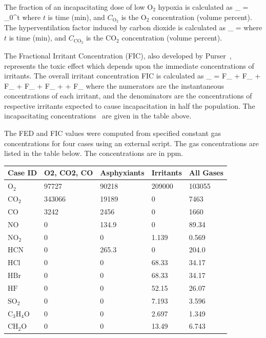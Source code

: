 \documentclass[11pt]{book}
\begin{document}
The fraction of an incapacitating dose of low O${}_2$ hypoxia is calculated as
\be
{}_ =  \int_0^t 
\ee
where $t$ is time (min), and $C_\mathrm{O_2}$ is the O${}_2$ concentration (volume percent).
The hyperventilation factor induced by carbon dioxide is calculated as
\be
{}_ =  \label{co2hyp2}
\ee
where $t$ is time (min), and $C_\mathrm{CO_2}$ is the CO${}_2$ concentration (volume percent).

The Fractional Irritant Concentration (FIC), also developed by Purser~\cite{SFPE:Purser}, represents the toxic effect which
depends upon the immediate concentrations of irritants. The overall irritant concentration FIC is calculated as
\be
{}_ =
        {F_} +
        {F_} +
         {F_} +
       {F_} +
       {F_} +
     +
      {F_}
\ee
where the numerators are the instantaneous concentrations of each irritant, and the denominators are the concentrations of respective irritants
expected to cause incapacitation in half the population. The incapacitating concentrations~\cite{SFPE:Purser} are given in the table above.

The FED and FIC values were computed from specified constant gas concentrations for four cases using an external script.
The gas concentrations are listed in the table below. The concentrations are in ppm.
\begin{center}
\begin{tabular}{|l|l|l|l|l|}
\hline Case ID & O2, CO2, CO & Asphyxiants & Irritants & All Gases \\ \hline \hline
$\mathrm{O_2}$ & 97727 & 90218 & 209000 & 103055 \\ \hline
$\mathrm{CO_2}$ & 343066 & 19189 & 0 & 7463 \\ \hline
$\mathrm{CO}$ & 3242 & 2456 & 0 & 1660 \\ \hline
$\mathrm{NO}$ & 0 & 134.9 & 0 & 89.34 \\ \hline
$\mathrm{NO_2}$ & 0 & 0 & 1.139 & 0.569 \\ \hline
$\mathrm{HCN}$ & 0 & 265.3 & 0 & 204.0 \\ \hline
$\mathrm{HCl}$ & 0 & 0 & 68.33 & 34.17 \\ \hline
$\mathrm{HBr}$ & 0 & 0 & 68.33 & 34.17 \\ \hline
$\mathrm{HF}$ & 0 & 0 & 52.15 & 26.07 \\ \hline
$\mathrm{SO_2}$ & 0 & 0 & 7.193 & 3.596 \\ \hline
$\mathrm{C_3H_4O}$ & 0 & 0 & 2.697 & 1.349 \\ \hline
$\mathrm{CH_2O}$ & 0 & 0 & 13.49 & 6.743  \\ \hline
\end{tabular}
\end{center}
\end{document}
